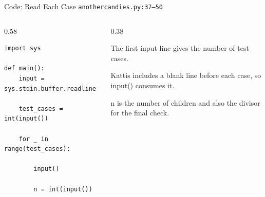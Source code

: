 \documentclass[aspectratio=169,11pt]{beamer}
\begin{document}
\begin{frame}[fragile]{Code: Read Each Case}
\scriptsize
{} \texttt{anothercandies.py:37--50}

\vspace{0.08cm}
\begin{columns}[T,totalwidth=\textwidth]
\begin{column}{0.58\textwidth}
\begin{lstlisting}[style=cpcode]
import sys

def main():
    input = sys.stdin.buffer.readline

    test_cases = int(input())

    for _ in range(test_cases):

        input()

        n = int(input())
\end{lstlisting}
\end{column}
\begin{column}{0.38\textwidth}
\begin{tightitemize}
  \item The first input line gives the number of test cases.
  \item Kattis includes a blank line before each case, so input() consumes it.
  \item n is the number of children and also the divisor for the final check.
\end{tightitemize}
\end{column}
\end{columns}
\end{frame}
\end{document}
